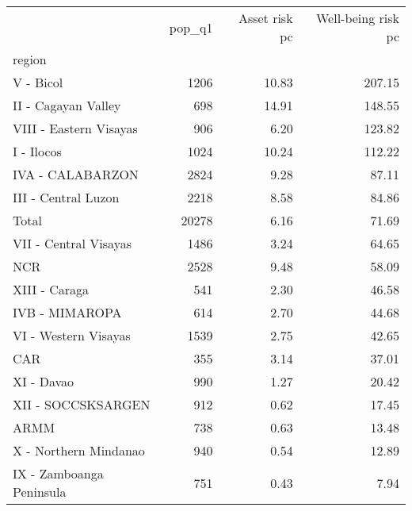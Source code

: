 \begin{tabular}{lrrr}
\toprule
{} &  pop\_q1 &  Asset risk pc &  Well-being risk pc \\
region                   &         &                &                     \\
\midrule
V - Bicol                &    1206 &          10.83 &              207.15 \\
II - Cagayan Valley      &     698 &          14.91 &              148.55 \\
VIII - Eastern Visayas   &     906 &           6.20 &              123.82 \\
I - Ilocos               &    1024 &          10.24 &              112.22 \\
IVA - CALABARZON         &    2824 &           9.28 &               87.11 \\
III - Central Luzon      &    2218 &           8.58 &               84.86 \\
Total                    &   20278 &           6.16 &               71.69 \\
VII - Central Visayas    &    1486 &           3.24 &               64.65 \\
NCR                      &    2528 &           9.48 &               58.09 \\
XIII - Caraga            &     541 &           2.30 &               46.58 \\
IVB - MIMAROPA           &     614 &           2.70 &               44.68 \\
VI - Western Visayas     &    1539 &           2.75 &               42.65 \\
CAR                      &     355 &           3.14 &               37.01 \\
XI - Davao               &     990 &           1.27 &               20.42 \\
XII - SOCCSKSARGEN       &     912 &           0.62 &               17.45 \\
ARMM                     &     738 &           0.63 &               13.48 \\
X - Northern Mindanao    &     940 &           0.54 &               12.89 \\
IX - Zamboanga Peninsula &     751 &           0.43 &                7.94 \\
\bottomrule
\end{tabular}

